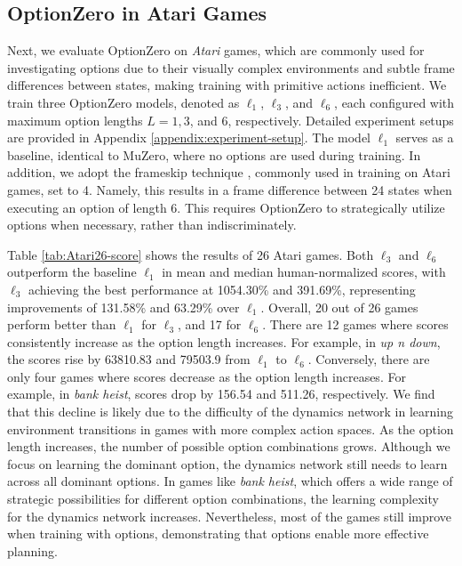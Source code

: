\subsection{OptionZero in Atari Games}
\label{sec:optionzero_atari}
Next, we evaluate OptionZero on \textit{Atari} games, which are commonly used for investigating options \cite{sharma_learning_2016,dewaard_monte_2016,durugkar_deep_2016,bacon_optioncritic_2017,vezhnevets_strategic_2016,kim_lesson_2023,lakshminarayanan_dynamic_2017,riemer_role_2020} due to their visually complex environments and subtle frame differences between states, making training with primitive actions inefficient.
We train three OptionZero models, denoted as $\ell_1$, $\ell_3$, and $\ell_6$, each configured with maximum option lengths $L = 1, 3$, and $6$, respectively.
Detailed experiment setups are provided in Appendix \ref {appendix:experiment-setup}.
The model $\ell_1$ serves as a baseline, identical to MuZero, where no options are used during training.
In addition, we adopt the frameskip technique \cite{mnih_humanlevel_2015}, commonly used in training on Atari games, set to 4.
Namely, this results in a frame difference between 24 states when executing an option of length 6.
This requires OptionZero to strategically utilize options when necessary, rather than indiscriminately.

Table \ref{tab:Atari26-score} shows the results of 26 Atari games.
Both $\ell_3$ and $\ell_6$ outperform the baseline $\ell_1$ in mean and median human-normalized scores, with $\ell_3$ achieving the best performance at 1054.30\% and 391.69\%, representing improvements of 131.58\% and 63.29\% over $\ell_1$.
Overall, 20 out of 26 games perform better than $\ell_1$ for $\ell_3$, and 17 for $\ell_6$.
There are 12 games where scores consistently increase as the option length increases.
For example, in \textit{up n down}, the scores rise by 63810.83 and 79503.9 from $\ell_1$ to $\ell_6$.
Conversely, there are only four games where scores decrease as the option length increases.
For example, in \textit{bank heist}, scores drop by 156.54 and 511.26, respectively.
We find that this decline is likely due to the difficulty of the dynamics network in learning environment transitions \cite{vries_visualizing_2021, he_what_2024, guei2024interpreting} in games with more complex action spaces.
As the option length increases, the number of possible option combinations grows.
Although we focus on learning the dominant option, the dynamics network still needs to learn across all dominant options.
In games like \textit{bank heist}, which offers a wide range of strategic possibilities for different option combinations, the learning complexity for the dynamics network increases.
Nevertheless, most of the games still improve when training with options, demonstrating that options enable more effective planning.


